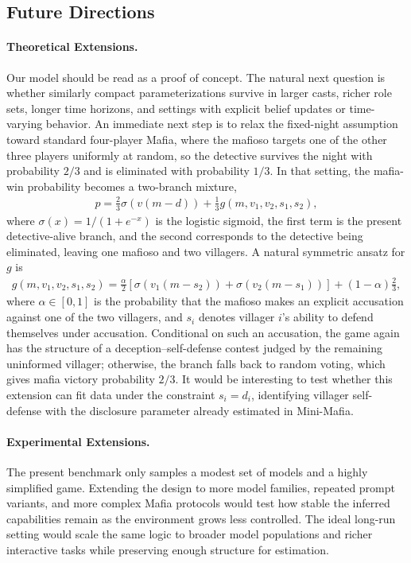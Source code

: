 \documentclass[sigconf]{aamas}
\begin{document}
\subsection{Future Directions}

\paragraph{Theoretical Extensions.} Our model should be read as a proof of concept. The natural next question is whether similarly compact parameterizations survive in larger casts, richer role sets, longer time horizons, and settings with explicit belief updates or time-varying behavior. An immediate next step is to relax the fixed-night assumption toward standard four-player Mafia, where the mafioso targets one of the other three players uniformly at random, so the detective survives the night with probability $2/3$ and is eliminated with probability $1/3$. In that setting, the mafia-win probability becomes a two-branch mixture,
\begin{align}
    p = \frac{2}{3}\sigma\!\left(v(m-d)\right) + \frac{1}{3}g(m,v_1,v_2,s_1,s_2),
\end{align}
where $\sigma(x)=1/(1+e^{-x})$ is the logistic sigmoid, the first term is the present detective-alive branch, and the second corresponds to the detective being eliminated, leaving one mafioso and two villagers. A natural symmetric ansatz for $g$ is
\begin{align}
    g(m,v_1,v_2,s_1,s_2) =
    \frac{\alpha}{2}
    \left[
        \sigma\!\left(v_1(m-s_2)\right)
        +
        \sigma\!\left(v_2(m-s_1)\right)
    \right]
    +(1-\alpha)\frac{2}{3},
\end{align}
where $\alpha\in[0,1]$ is the probability that the mafioso makes an explicit accusation against one of the two villagers, and $s_i$ denotes villager $i$'s ability to defend themselves under accusation. Conditional on such an accusation, the game again has the structure of a deception--self-defense contest judged by the remaining uninformed villager; otherwise, the branch falls back to random voting, which gives mafia victory probability $2/3$. It would be interesting to test whether this extension can fit data under the constraint $s_i=d_i$, identifying villager self-defense with the disclosure parameter already estimated in Mini-Mafia.

\paragraph{Experimental Extensions.} The present benchmark only samples a modest set of models and a highly simplified game. Extending the design to more model families, repeated prompt variants, and more complex Mafia protocols would test how stable the inferred capabilities remain as the environment grows less controlled. The ideal long-run setting would scale the same logic to broader model populations and richer interactive tasks while preserving enough structure for estimation.
\end{document}
